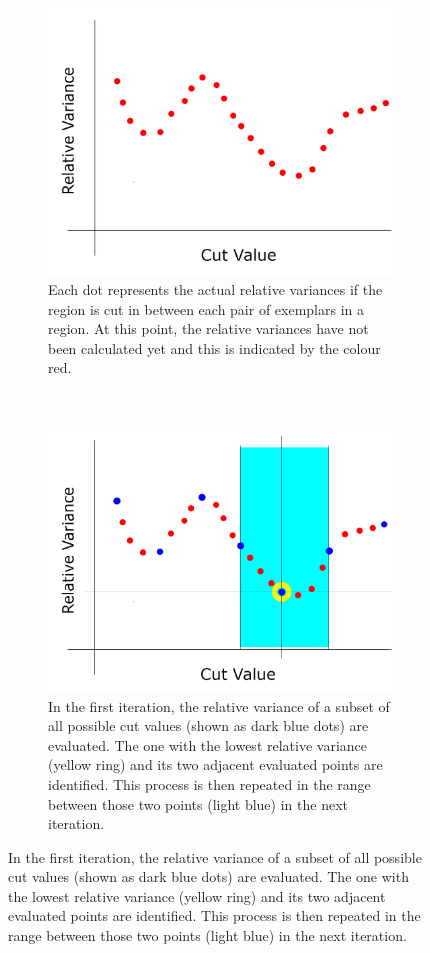 \begin{figure}[!htbp]
	\centering
	\begin{subfigure}[t]{0.45\textwidth}
		\centering
		\includegraphics[width=1.0 \textwidth]{"fig/cbla/divide-and-zoom-in_1"}
		\caption{Each dot represents the actual relative variances if the region is cut in between each pair of exemplars in a region. At this point, the relative variances have not been calculated yet and this is indicated by the colour red.}
		\label{fig:divide-and-zoom-in_1}
	\end{subfigure}	
	~
	\begin{subfigure}[t]{0.45\textwidth}
		\centering
		\includegraphics[width=1.0 \textwidth]{"fig/cbla/divide-and-zoom-in_2"}
		\caption{In the first iteration, the relative variance of a subset of all possible cut values (shown as dark blue dots) are evaluated. The one with the lowest relative variance (yellow ring) and its two adjacent evaluated points are identified. This process is then repeated in the range between those two points (light blue) in the next iteration.}
		\label{fig:divide-and-zoom-in_2}
	\end{subfigure}	
	

\end{figure}
